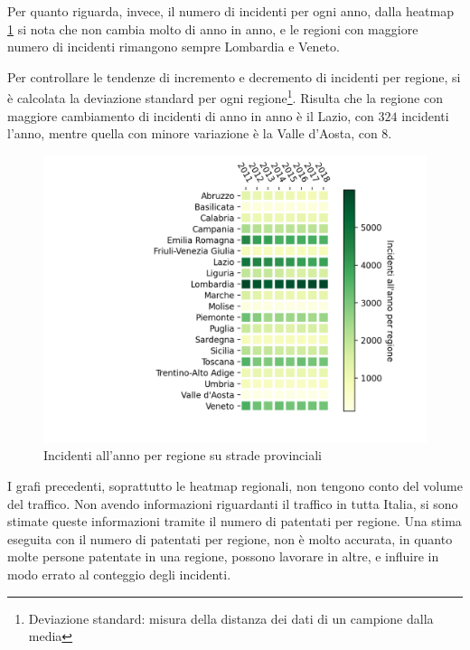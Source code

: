 \documentclass[a4paper,12pt]{report}
\begin{document}
Per quanto riguarda, invece, il numero di incidenti per ogni anno, 
dalla heatmap \ref{fig:regione-heatmap} 
si nota che non cambia molto di anno in anno, e le regioni con maggiore numero 
di incidenti rimangono sempre Lombardia e Veneto.

Per controllare le tendenze di incremento e decremento di incidenti per regione, 
si è calcolata la deviazione standard per ogni regione\footnote{Deviazione standard: 
misura della distanza dei dati di un campione dalla media\cite{PROB_E_STATISTICA:2}}.
Risulta che la regione con maggiore cambiamento di incidenti di anno in anno 
è il Lazio, con $324$ incidenti l'anno, mentre quella con minore 
variazione è la Valle d'Aosta, con $8$.

\begin{figure}
    \includegraphics[width=\linewidth]{../src/incidenti/incidenti_aci/mappe_regioni/regioni_heatmap.png}
    \caption{Incidenti all'anno per regione su strade provinciali}
    \label{fig:regione-heatmap}
\end{figure}

I grafi precedenti, soprattutto le heatmap regionali, non tengono conto del 
volume del traffico.
Non avendo informazioni riguardanti il traffico in tutta Italia, si sono stimate 
queste informazioni tramite il numero di patentati per regione.
Una stima eseguita con il numero di patentati per regione, non è molto accurata, 
in quanto molte persone patentate in una regione, possono lavorare in altre, e 
influire in modo errato al conteggio degli incidenti. 
\end{document}
